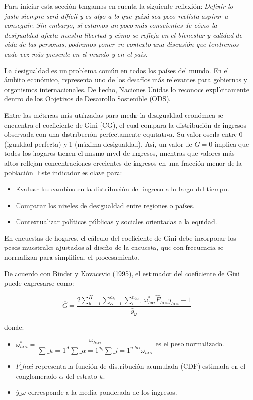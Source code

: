 \documentclass[
  12pt,
]{book}
\providecommand{\tightlist}{%
  \setlength{\itemsep}{0pt}\setlength{\parskip}{0pt}}
\begin{document}
Para iniciar esta sección tengamos en cuenta la siguiente reflexión: \emph{Definir lo justo siempre será difícil y es algo a lo que quizá sea poco realista aspirar a conseguir. Sin embargo, si estamos un poco más conscientes de cómo la desigualdad afecta nuestra libertad y cómo se refleja en el bienestar y calidad de vida de las personas, podremos poner en contexto una discusión que tendremos cada vez más presente en el mundo y en el país.}

La desigualdad es un problema común en todos los países del mundo. En el ámbito económico, representa uno de los desafíos más relevantes para gobiernos y organismos internacionales. De hecho, Naciones Unidas lo reconoce explícitamente dentro de los Objetivos de Desarrollo Sostenible (ODS).

Entre las métricas más utilizadas para medir la desigualdad económica se encuentra el coeficiente de Gini (CG), el cual compara la distribución de ingresos observada con una distribución perfectamente equitativa. Su valor oscila entre 0 (igualdad perfecta) y 1 (máxima desigualdad). Así, un valor de \(G = 0\) implica que todos los hogares tienen el mismo nivel de ingresos, mientras que valores más altos reflejan concentraciones crecientes de ingresos en una fracción menor de la población. Este indicador es clave para:

\begin{itemize}
\tightlist
\item
  Evaluar los cambios en la distribución del ingreso a lo largo del tiempo.
\item
  Comparar los niveles de desigualdad entre regiones o países.
\item
  Contextualizar políticas públicas y sociales orientadas a la equidad.
\end{itemize}

En encuestas de hogares, el cálculo del coeficiente de Gini debe incorporar los pesos muestrales ajustados al diseño de la encuesta, que con frecuencia se normalizan para simplificar el procesamiento.

De acuerdo con Binder y Kovacevic (1995), el estimador del coeficiente de Gini puede expresarse como:

\[
\hat{G} = \frac{2\sum_{h=1}^{H}\sum_{\alpha=1}^{a_{h}}\sum_{i=1}^{n_{h\alpha}}\omega_{h\alpha i}^{*}\hat{F}_{h\alpha i}y_{h\alpha i}-1}{\bar{y}_{\omega}}
\]

donde:

\begin{itemize}
\tightlist
\item
  \(\omega_{h\alpha i}^{*}=\dfrac{\omega_{h\alpha i}}{\sum\_{h=1}^{H}\sum\_{\alpha=1}^{a_{h}}\sum\_{i=1}^{n\_{h\alpha}}\omega_{h\alpha i}}\) es el peso normalizado.
\item
  \(\hat{F}\_{h\alpha i}\) representa la función de distribución acumulada (CDF) estimada en el conglomerado \(\alpha\) del estrato \(h\).
\item
  \(\bar{y}\_{\omega}\) corresponde a la media ponderada de los ingresos.
\end{itemize}
\end{document}

